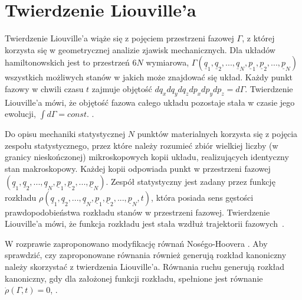 \documentclass[12pt,a4paper,openright]{report} %
\begin{document}
\section{Twierdzenie Liouville'a}
Twierdzenie Liouville'a wiąże się z pojęciem przestrzeni fazowej $\Gamma$, z której korzysta się w geometrycznej analizie zjawisk mechanicznych. Dla układów hamiltonowskich jest to przestrzeń $6N$ wymiarowa, $\Gamma(\underline{q}_1, \underline{q}_2,...,\underline{q}_N, \underline{p}_1, \underline{p}_2,...,\underline{p}_N)$ wszystkich możliwych stanów w jakich może znajdować się układ. Każdy punkt fazowy w chwili czasu $t$ zajmuje objętość $dq_x dq_y dq_z dp_x dp_y dp_z= d\Gamma$. Twierdzenie Liouville'a mówi, że objętość fazowa całego układu pozostaje stała w czasie jego ewolucji, $ \int d \Gamma = const.$ \cite{Landau}.

Do opisu mechaniki statystycznej $N$ punktów materialnych korzysta się z pojęcia zespołu statystycznego, przez które należy rozumieć zbiór wielkiej liczby (w granicy nieskończonej) mikroskopowych kopii układu, realizujących identyczny stan makroskopowy. Każdej kopii odpowiada punkt w przestrzeni fazowej $(\underline{q}_1, \underline{q}_2,...,\underline{q}_N, \underline{p}_1, \underline{p}_2,...,\underline{p}_N)$. Zespół statystyczny jest zadany przez funkcję rozkładu $\rho(\underline{q}_1, \underline{q}_2,...,\underline{q}_N, \underline{p}_1, \underline{p}_2,...,\underline{p}_N, t)$, która posiada sens gęstości prawdopodobieństwa rozkładu stanów w przestrzeni fazowej. Twierdzenie Liouville'a mówi, że funkcja rozkładu jest stała wzdłuż trajektorii fazowych~\cite{Zubariew}.

W rozprawie zaproponowano modyfikację równań Nos\'{e}go-Hoovera \cite{Nose1984, Hoover1985}. Aby sprawdzić, czy zaproponowane równania również generują rozkład kanoniczny należy skorzystać z twierdzenia Liouville'a. Równania ruchu generują rozkład kanoniczny, gdy dla założonej funkcji rozkładu, spełnione jest równanie $\dot{\rho}(\Gamma, t)=0$, \cite{Hoover1985}.
%
\end{document}
